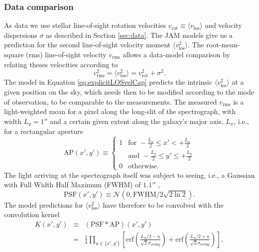 \documentclass[useAMS,usenatbib]{mnras}
\begin{document}
\subsubsection{Data comparison} 

As data we use stellar line-of-sight rotation velocities $v_\text{rot} \equiv \langle v_\text{los} \rangle$ and velocity dispersions $\sigma$ as described in Section \ref{sec:data}. The JAM models give us a prediction for the second line-of-sight velocity moment $\langle v_\text{los}^2 \rangle$. The root-mean-square (rms) line-of-sight velocity $v_\text{rms}$ allows a data-model comparison by relating theses velocities according to 
\begin{equation*}
v_\text{rms}^2 = \langle v_\text{los}^2 \rangle = v_\text{rot}^2 + \sigma^2.
\end{equation*}
The model in Equation \eqref{eq:explicitLOSvelCap} predicts the intrinsic $\langle v_\text{los}^2 \rangle$ at a given position on the sky, which needs then to be modified according to the mode of observation, to be comparable to the measurements. The measured $v_\text{rms}$ is a light-weighted mean for a pixel along the long-slit of the spectrograph, with width $L_y = 1''$ \citep{SWELLSV} and a certain given extent along the galaxy's major axis, $L_x$, i.e., for a rectangular aperture
\begin{equation*}
\text{AP}(x',y') \equiv \left\{ \begin{array}{ll} 1 & \text{for } -\frac{L_x}{2} \leq x' < + \frac{L_x}{2}\\
& \text{and } - \frac{L_y}{2} \leq y' \leq + \frac{L_y}{2}  \\ 0 & \text{otherwise.} \end{array} \right.
\end{equation*}
The light arriving at the spectrograph itself was subject to seeing, i.e., a Gaussian with Full Width Half Maximum (FWHM) of $1.1''$ \citep{SWELLSV},
\begin{equation*}
\text{PSF}(x',y')\equiv\mathscr{N}(0,\text{FWHM}/2\sqrt{2\ln2}).
\end{equation*}
The model predictions for $\langle v_\text{los}^2 \rangle$ have therefore to be convolved with the convolution kernel
\begin{eqnarray*}
K(x',y') &\equiv& (\text{PSF} \ast \text{AP})(x',y') \\
&=& \frac{1}{4} \prod_{u \in \{x',y'\}} \left[ \text{erf}\left( \frac{L_u/2 - u}{\sqrt{2}\sigma_\text{seeing}}\right) + \text{erf} \left( \frac{L_u/2 + u}{\sqrt{2} \sigma_\text{seeing}} \right) \right],
\end{eqnarray*}
\end{document}
